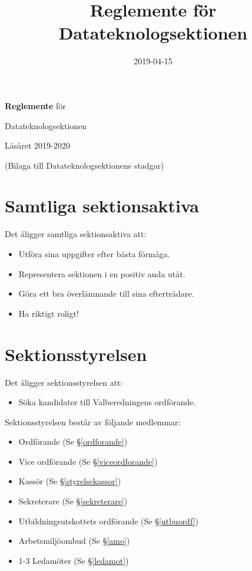 \documentclass{datateknologsektionen-document}
\title{Reglemente för Datateknologsektionen}
\date{2019-04-15}
\begin{document}
\hspace{0pt}
\vfill
\begin{center}

\Huge{
  \textbf{Reglemente} för
  
  Datateknologsektionen
  
  Läsåret 2019-2020
}

  \vspace{30pt}

\Large{(Bilaga till Datateknologsektionens stadgar)}
  
\end{center}
\vfill
\hspace{0pt}

\pagebreak

\tableofcontents

\pagebreak

\section{Samtliga sektionsaktiva}
Det åligger samtliga sektionsaktiva att:
\begin{itemize}
  \item Utföra sina uppgifter efter bästa förmåga.
  \item Representera sektionen i en positiv anda utåt.
  \item Göra ett bra överlämnande till sina efterträdare.
  \item Ha riktigt roligt!
\end{itemize}
\section{Sektionsstyrelsen}
Det åligger sektionsstyrelsen att:
\begin{itemize}
  \item Söka kandidater till Valberedningens ordförande.
\end{itemize}
Sektionsstyrelsen består av följande medlemmar:
\begin{itemize}
  \item Ordförande (Se \S \ref{ordforande})
  \item Vice ordförande (Se \S \ref{viceordforande})
  \item Kassör (Se \S \ref{styrelsekassor})
  \item Sekreterare (Se \S \ref{sekreterare})
  \item Utbildningsutskottets ordförande (Se \S \ref{utbuordf})
  \item Arbetsmiljöombud (Se \S \ref{amo})
  \item 1-3 Ledamöter (Se \S \ref{ledamot})
\end{itemize}
\end{document}
